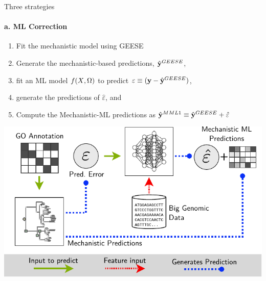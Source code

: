 \documentclass[10pt,aspectratio=169]{beamer}
\newcounter{frame}[frame]
\begin{document}
\begin{frame}{Three strategies}
	\framesubtitle{a. ML Correction}
	\begin{minipage}[b]{.4\linewidth}
		\begin{enumerate}[<+->]
			\item Fit the mechanistic model using GEESE
			\item Generate the mechanistic-based predictions, $\hat {\mathbf{y}{}}{}^{GEESE}$, 
			\item fit an ML model $f(X{}, \Omega)$ to predict $\varepsilon \equiv (\mathbf{y}{} - \hat {\mathbf{y}{}}{}^{GEESE})$, \item generate the predictions of $\hat\varepsilon$, and 
			\item Compute the Mechanistic-ML predictions as $\hat {\mathbf{y}{}}{}^{MML1} \equiv \hat {\mathbf{y}{}}{}^{GEESE} + \hat\varepsilon$
		\end{enumerate}
	\end{minipage}\hfill%
	\begin{minipage}[b]{.55\linewidth}
	\includegraphics[width=1\linewidth]{fig/mech-ml-model-a.pdf}
	\end{minipage}
\end{frame}
\end{document}
